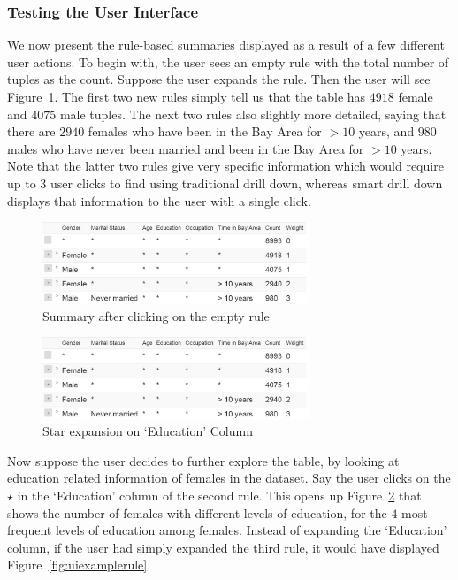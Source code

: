 \documentclass[10pt,journal,compsoc]{IEEEtran}
\begin{document}
\subsubsection{Testing the User Interface}
We now present the rule-based summaries displayed as a result of a few different user actions.
To begin with, the user sees an empty rule with the total number of tuples as the count. Suppose the user expands the rule. Then the user will see Figure~\ref{fig:uiexample1}. The first two new rules simply tell us that the table has $4918$ female and $4075$ male tuples. The next two rules also slightly more detailed, saying that there are $2940$ females who have been in the Bay Area for $> 10$ years, and $980$ males who have never been married and been in the Bay Area for $> 10$ years. Note that the latter two rules give very specific information which would require up to $3$ user clicks to find using traditional drill down, whereas smart drill down displays that information to the user with a single click.

\begin{figure}
\centering
\includegraphics[width=80mm,frame]{graphs/screenshots6col/empty_expansion.jpg}
\caption{Summary after clicking on the empty rule \label{fig:uiexample1}}
\vspace{-10pt}
\end{figure} 

\begin{figure}
\centering
\includegraphics[width=80mm,frame]{graphs/screenshots6col/empty_expansion.jpg}
\caption{Star expansion on `Education' Column \label{fig:uiexamplestar}}
\vspace{-10pt}
\end{figure}

Now suppose the user decides to further explore the table, by looking at education related information of females in the dataset. Say the user clicks on the $\star$ in the `Education' column of the second rule. This opens up Figure~\ref{fig:uiexamplestar} that shows the number of females with different levels of education, for the $4$ most frequent levels of education among females. Instead of expanding the `Education' column, if the user had simply expanded the third rule, it would have displayed Figure~\ref{fig:uiexamplerule}. 
\end{document}
